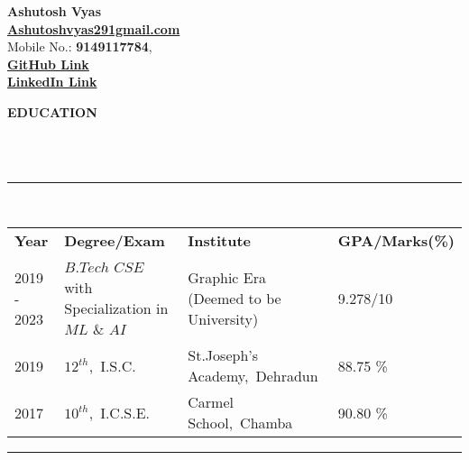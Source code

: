 \documentclass[a4paper,10pt]{article}
\newcommand{\lsep}{-0.5cm}
\newcommand{\resheading}[1]{{\small \colorbox{mygrey}{\begin{minipage}{0.98\textwidth}{\textbf{#1 \vphantom{p\^{E}}}}\end{minipage}}}}
\begin{document}
\textbf{Ashutosh Vyas} \\
\indent \textbf{\url{Ashutoshvyas291gmail.com}} \\
\indent Mobile No.: \textbf{9149117784}, \ \\
\indent \href{http://github.com/Ash20vyas}{\textbf{GitHub Link}}\\
\indent \href{https://www.linkedin.com/in/ashutoshvyas291}{\textbf{LinkedIn Link}}\\

\resheading{\textbf{EDUCATION} }\\[\lsep]
\\
\indent \rule{7.34in}{0.4pt}\\
\indent \begin{tabular}{ l @{\hskip 0.17in} l @{\hskip 0.17in} l @{\hskip 0.17in} l @{\hskip 0.17in} }
\noindent \textbf{Year} & \textbf{Degree/Exam} & \textbf{Institute} & \textbf{GPA/Marks(\%)}\\
2019 - 2023 & $B.Tech$ $CSE$ with Specialization in $ML$ $\&$ $AI$ & Graphic Era (Deemed to be University) & 9.278/10 \\
2019 & $12^{th}$,\ I.S.C. & St.Joseph's Academy,\ Dehradun & 88.75 \% \\
2017 & $10^{th}$,\ I.C.S.E. & Carmel School,\ Chamba & 90.80 \%\\

\end{tabular}
\indent \rule{7.34in}{0.4pt}
\\
\end{document}
